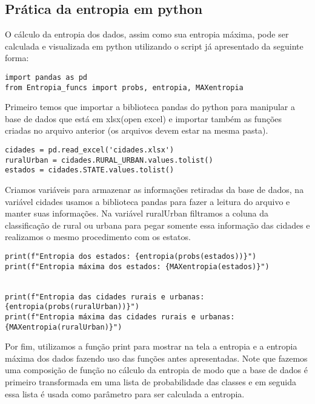 \documentclass{article}
\begin{document}
\subsection{Prática da entropia em python}
O cálculo da entropia dos dados, assim como sua entropia máxima, pode ser calculada e visualizada em python utilizando o script já apresentado da seguinte forma:\\
\begin{verbatim}
import pandas as pd
from Entropia_funcs import probs, entropia, MAXentropia

\end{verbatim}

Primeiro temos que importar a biblioteca pandas do python para manipular a base de dados que está em xlsx(open excel) e importar também as funções criadas no arquivo anterior (os arquivos devem estar na mesma pasta).

\begin{verbatim}
cidades = pd.read_excel('cidades.xlsx')
ruralUrban = cidades.RURAL_URBAN.values.tolist()
estados = cidades.STATE.values.tolist()
\end{verbatim}

Criamos variáveis para armazenar as informações retiradas da base de dados, na variável cidades usamos a biblioteca pandas para fazer a leitura do arquivo e manter suas informações.  Na variável ruralUrban filtramos a coluna da classificação de rural ou urbana para pegar somente essa informação das cidades e realizamos o mesmo procedimento com os estatos.

\begin{verbatim}
print(f"Entropia dos estados: {entropia(probs(estados))}")
print(f"Entropia máxima dos estados: {MAXentropia(estados)}")


print(f"Entropia das cidades rurais e urbanas: {entropia(probs(ruralUrban))}")
print(f"Entropia máxima das cidades rurais e urbanas: {MAXentropia(ruralUrban)}")

\end{verbatim}

Por fim, utilizamos a função print para mostrar na tela a entropia e a entropia máxima dos dados fazendo uso das funções antes apresentadas. Note que fazemos uma composição de função no cálculo da entropia de modo que a base de dados é primeiro transformada em uma lista de probabilidade das classes e em seguida essa lista é usada como parâmetro para ser calculada a entropia.\\
\end{document}
